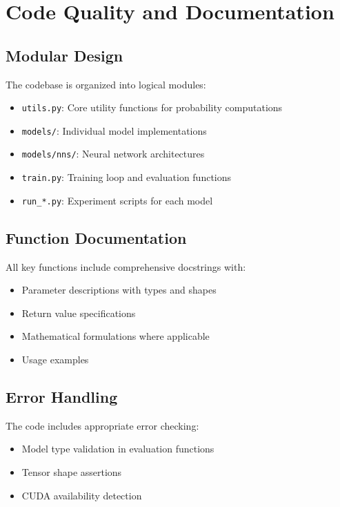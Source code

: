\documentclass{article}
\begin{document}
\section{Code Quality and Documentation}

\subsection{Modular Design}

The codebase is organized into logical modules:
\begin{itemize}
\item \texttt{utils.py}: Core utility functions for probability computations
\item \texttt{models/}: Individual model implementations
\item \texttt{models/nns/}: Neural network architectures
\item \texttt{train.py}: Training loop and evaluation functions
\item \texttt{run\_*.py}: Experiment scripts for each model
\end{itemize}

\subsection{Function Documentation}

All key functions include comprehensive docstrings with:
\begin{itemize}
\item Parameter descriptions with types and shapes
\item Return value specifications
\item Mathematical formulations where applicable
\item Usage examples
\end{itemize}

\subsection{Error Handling}

The code includes appropriate error checking:
\begin{itemize}
\item Model type validation in evaluation functions
\item Tensor shape assertions
\item CUDA availability detection
\end{itemize}
\end{document}
